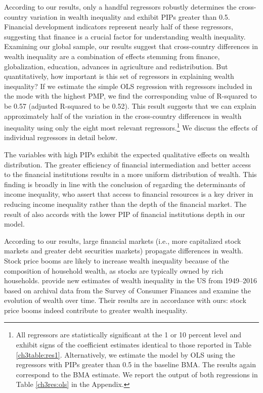 \begin{refsection}
According to our results, only a handful regressors robustly determines the cross-country variation in wealth inequality and exhibit \acp{PIP} greater than 0.5. Financial development indicators represent nearly half of these regressors, suggesting that finance is a crucial factor for understanding wealth inequality. Examining our global sample, our results suggest that cross-country differences in wealth inequality are a combination of effects stemming from finance, globalization, education, advances in agriculture and redistribution. But quantitatively, how important is this set of regressors in explaining wealth inequality? If we estimate the simple OLS regression with regressors included in the mode with the highest \ac{PMP}, we find the corresponding value of R-squared to be 0.57 (adjusted R-squared to be 0.52). This result suggests that we can explain approximately half of the variation in the cross-country differences in wealth inequality using only the eight most relevant regressors.\footnote{All regressors are statistically significant at the 1 or 10 percent level and exhibit signs of the coefficient estimates identical to those reported in Table \ref{ch3table:res1}. Alternatively, we estimate the model by OLS using the regressors with \acp{PIP} greater than 0.5 in the baseline \ac{BMA}. The results again correspond to the \ac{BMA} estimate. We report the output of both regressions in Table \ref{ch3res:ols} in the Appendix.} We discuss the effects of individual regressors in detail below.

The variables with high \acp{PIP} exhibit the expected qualitative effects on wealth distribution. The greater efficiency of financial intermediation and better access to the financial institutions results in a more uniform distribution of wealth. This finding is broadly in line with the conclusion of \textcite{claessens2007finance} regarding the determinants of income inequality, who assert that access to financial resources is a key driver in reducing income inequality rather than the depth of the financial market. The result of \textcite{claessens2007finance} also accords with the lower PIP of financial institutions depth in our model. 

According to our results, large financial markets (i.e., more capitalized stock markets and greater debt securities markets) propagate differences in wealth. Stock price booms are likely to increase wealth inequality because of the composition of household wealth, as stocks are typically owned by rich households. \textcite{kuhn} provide new estimates of wealth inequality in the US from 1949--2016 based on archival data from the Survey of Consumer Finances and examine the evolution of wealth over time. Their results are in accordance with ours: stock price booms indeed contribute to greater wealth inequality.  


\end{refsection}
